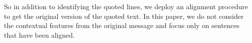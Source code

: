 So in addition to identifying the quoted lines, we deploy an alignment procedure to get the original version of the quoted text. 
In this paper, we do not consider the contextual features from the original message and focus only on sentences that have been aligned. 















